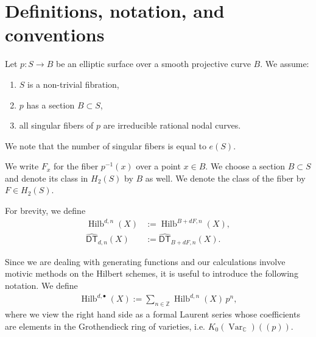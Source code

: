 \documentclass[12pt]{amsart}
\theoremstyle{definition}
\newcommand{\CC} {\mathbb{C}}          %
\newcommand{\ZZ} {\mathbb{Z}}		%
\newcommand{\Hilb}{\operatorname{Hilb}}
\newcommand{\DT}{\mathsf{DT}}
\newcommand{\Var}{\operatorname{Var}}
\newcommand{\conn}{\operatorname{conn}}
\newcommand{\DThat}{\widehat{\DT}}
\newcommand{\presectionspace}{\vspace{0.2cm}} %
\begin{document}



\presectionspace
\section{Definitions, notation, and conventions}

Let $p : S \rightarrow B$ be an elliptic surface over a smooth
projective curve $B$. We assume:
\begin{enumerate}
\item $S$ is a non-trivial fibration,
\item $p$ has a section $B \subset S$,
\item all singular fibers of $p$ are irreducible rational nodal curves. 
\end{enumerate}
We note that the number of singular fibers is equal to $e(S)$.

We write $F_x$ for the fiber $p^{-1}(x)$ over a  point $x \in
B$. We choose a section $B \subset S$ and denote its class in $H_2(S)$
by $B$ as well. We denote the class of the fiber by $F \in H_2(S)$.


For brevity, we define
\begin{align*}
\Hilb^{d,n}(X) &:=\Hilb^{B+dF,n}(X), \\
\DThat _{d,n}(X) &:= \DThat_{B+dF,n}(X).
\end{align*}


\begin{comment}
The generating functions of interest are
\begin{align*}
\DT(X) &:= \sum_{d \geq 0} \DT_d(X) \, q^d := \sum_{d \geq 0} \sum_{n \in \ZZ} \DT_{d,n}(X) \, (-p)^n q^d, \\
\DThat (X) &:= \sum_{d \geq 0} \DThat _d(X) \, q^d := \sum_{d \geq 0} \sum_{n \in \ZZ} \DThat _{d,n}(X) \, p^n q^d.
\end{align*}
The corresponding connected series $\DT^{\conn}(X)$ and $\DThat ^{\conn}(X)$ are obtained after dividing by
\begin{align*}
&\sum_{d \geq 0} \sum_{n \in \ZZ} e(\Hilb^{dF,n}(X),\nu) \, (-p)^n q^d, \\
&\sum_{d \geq 0} \sum_{n \in \ZZ} e(\Hilb^{dF,n}(X)) \, p^n q^d,
\end{align*}
respectively.
\end{comment}

Since we are dealing with generating functions and our calculations
involve motivic methods on the Hilbert schemes, it is useful to
introduce the following notation. We define
\begin{align*}
\Hilb^{d,\bullet}(X) := \sum_{n \in \ZZ} \Hilb^{d,n}(X) \, p^n,
\end{align*}
where we view the right hand side as a formal Laurent series whose
coefficients are elements in the Grothendieck ring of varieties,
i.e. $K_0(\Var_{\CC})(\!(p)\!)$.
\end{document}
